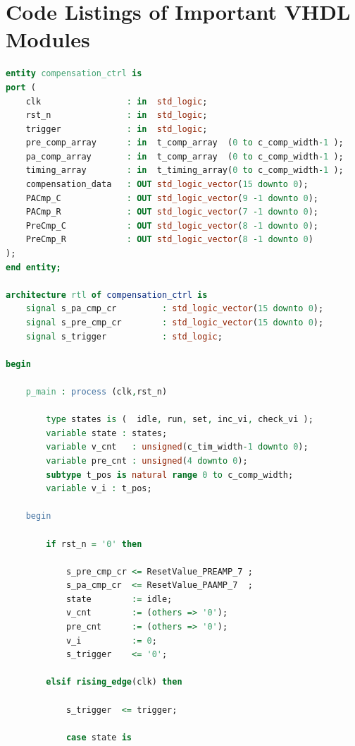 
\section{Code Listings of Important VHDL Modules}
\label{sec:hvs-fpga-compensation-vhdl}

\begin{lstlisting}[language=VHDL, caption={Compensation Control VHDL Module},
    label={lst:fpga-compensation-entity}]
entity compensation_ctrl is
port (
    clk                 : in  std_logic;
    rst_n               : in  std_logic;
    trigger             : in  std_logic;
    pre_comp_array      : in  t_comp_array  (0 to c_comp_width-1 );
    pa_comp_array       : in  t_comp_array  (0 to c_comp_width-1 );
    timing_array        : in  t_timing_array(0 to c_comp_width-1 );
    compensation_data   : OUT std_logic_vector(15 downto 0);
    PACmp_C             : OUT std_logic_vector(9 -1 downto 0);
    PACmp_R             : OUT std_logic_vector(7 -1 downto 0);
    PreCmp_C            : OUT std_logic_vector(8 -1 downto 0);
    PreCmp_R            : OUT std_logic_vector(8 -1 downto 0)
);
end entity;

architecture rtl of compensation_ctrl is
    signal s_pa_cmp_cr         : std_logic_vector(15 downto 0);
    signal s_pre_cmp_cr        : std_logic_vector(15 downto 0);
    signal s_trigger           : std_logic;

begin

    p_main : process (clk,rst_n)

        type states is (  idle, run, set, inc_vi, check_vi );
        variable state : states;
        variable v_cnt   : unsigned(c_tim_width-1 downto 0);
        variable pre_cnt : unsigned(4 downto 0);
        subtype t_pos is natural range 0 to c_comp_width;
        variable v_i : t_pos;

    begin

        if rst_n = '0' then

            s_pre_cmp_cr <= ResetValue_PREAMP_7 ;
            s_pa_cmp_cr  <= ResetValue_PAAMP_7  ;
            state        := idle;
            v_cnt        := (others => '0');
            pre_cnt      := (others => '0');
            v_i          := 0;
            s_trigger    <= '0';

        elsif rising_edge(clk) then

            s_trigger  <= trigger;

            case state is


\end{lstlisting}

